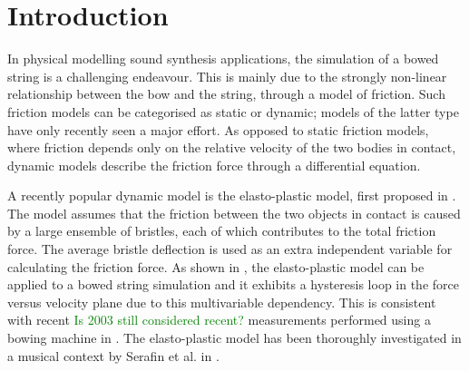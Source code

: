 \documentclass[twoside,a4paper,dvipsnames]{article}
\title{\papertitle}
\newif\ifpdf
\def\SWcomment[#1]{\textcolor{Green}{#1}}
\begin{document}
\ifpdf %
  \DeclareGraphicsExtensions{.png,.jpg,.pdf, .eps} 
\else  %
\fi

\maketitle
    
\begin{abstract}
The simulation of a bowed string is challenging due to the strongly non-linear relationship between the bow and the string. This relationship can be described through a model of friction. Several friction models in the literature have been proposed, from simple velocity dependent to more accurate ones. Similarly, a highly accurate technique to simulate a stiff string is the use of finite-difference time-domain (FDTD) methods. As these models are generally computationally heavy, implementation in real-time is challenging. This paper presents a real-time implementation of the combination of a complex friction model, namely the elasto-plastic friction model, and a stiff string simulated using FDTD methods. We show that it is possible to keep the CPU usage of a single bowed string below 6 percent. For real-time control of the bowed string, the Sensel Morph is used.
\end{abstract}
\section{Introduction}
\label{sec:intro}
In physical modelling sound synthesis applications, the simulation of a bowed string is a challenging endeavour. This is mainly due to the strongly non-linear relationship between the bow and the string, through a model of friction. Such friction models can be categorised as static or dynamic; models of the latter type have only recently seen a major effort. As opposed to static friction models, where friction depends only on the relative velocity of the two bodies in contact, dynamic models describe the friction force through a differential equation.

 A recently popular dynamic model is the elasto-plastic model, first proposed in \cite{Dupont2002}. The model assumes that the friction between the two objects in contact is caused by a large ensemble of bristles, each of which contributes to the total friction force. The average bristle deflection is used as an extra independent variable for calculating the friction force. As shown in \cite{Serafin2003}, the elasto-plastic model can be applied to a bowed string simulation and it exhibits a hysteresis loop in the force versus velocity plane due to this multivariable dependency.
 This is consistent with recent \SWcomment[Is 2003 still considered recent?]{} measurements performed using a bowing machine in \cite{Woodhouse2003}.
 The elasto-plastic model has been thoroughly investigated in a musical context by Serafin et al. in \cite{Serafin2003, Serafin2004, Avanzini2005}. 
\end{document}
